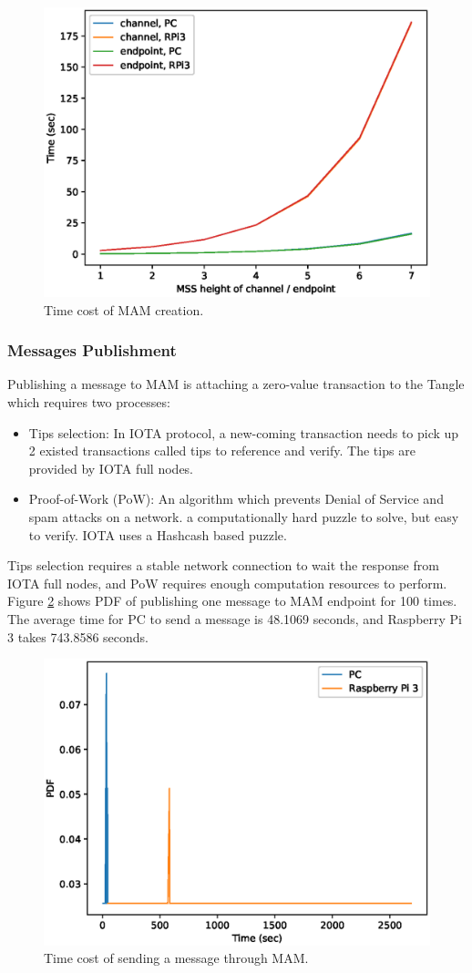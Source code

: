 \documentclass[journal,article,applsci,submit,moreauthors,pdftex]{Definitions/mdpi}
\begin{document}
\begin{figure}[H]
    \centering
    \includegraphics[width=3.3 in]{mam_create}
    \caption{Time cost of MAM creation.}
    \label{fig:mam_create}
\end{figure}

\subsubsection{Messages Publishment}
Publishing a message to MAM is attaching a zero-value transaction to the Tangle which requires two processes:
\begin{itemize}[leftmargin=*,labelsep=5.8mm]
	\item	Tips selection: In IOTA protocol, a new-coming transaction needs to pick up 2 existed transactions called tips to reference and verify. The tips are provided by IOTA full nodes.
	\item	Proof-of-Work (PoW): An algorithm which prevents Denial of Service and spam attacks on a network. a computationally hard puzzle to solve, but easy to verify. IOTA uses a Hashcash\cite{Hashcash} based puzzle.
\end{itemize}

Tips selection requires a stable network connection to wait the response from IOTA full nodes, and PoW requires enough computation resources to perform. Figure \ref{fig:mam_send} shows PDF of publishing one message to MAM endpoint for 100 times. The average time for PC to send a message is 48.1069 seconds, and Raspberry Pi 3 takes 743.8586 seconds.

\begin{figure}[H]
    \centering
    \includegraphics[width=3.3 in]{mam_send}
    \caption{Time cost of sending a message through MAM.}
    \label{fig:mam_send}
\end{figure}
\end{document}
